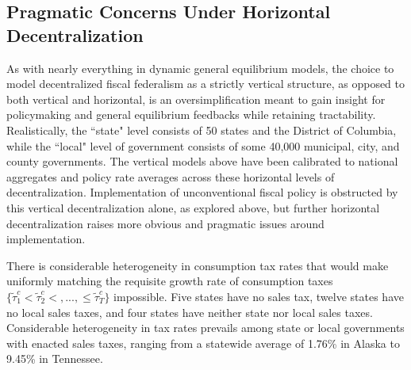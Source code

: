 \documentclass[12pt,letterpaper]{article}
\begin{document}
\subsection{Pragmatic Concerns Under Horizontal Decentralization}

As with nearly everything in dynamic general equilibrium models, the choice to model decentralized fiscal federalism as a strictly vertical structure, as opposed to both vertical and horizontal, is an oversimplification meant to gain insight for policymaking and general equilibrium feedbacks while retaining tractability. Realistically, the ``state" level consists of 50 states and the District of Columbia, while the ``local" level of government consists of some 40,000 municipal, city, and county governments. The vertical models above have been calibrated to national aggregates and policy rate averages across these horizontal levels of  decentralization. Implementation of unconventional fiscal policy is obstructed by this vertical decentralization alone, as explored above, but further horizontal decentralization raises more obvious and pragmatic issues around implementation. 

There is considerable heterogeneity in consumption tax rates that would make uniformly matching the requisite growth rate of consumption taxes $\{ \tilde{\tau}_1^c < \tilde{\tau}_2^c <, ..., \leq \tilde{\tau}_T^c\}$ impossible. Five states have no sales tax, twelve states have no local sales taxes, and four states have neither state nor local sales taxes. Considerable heterogeneity in tax rates prevails among state or local governments with enacted sales taxes, ranging from a statewide average of 1.76\% in Alaska to 9.45\% in Tennessee. 

\end{document}

